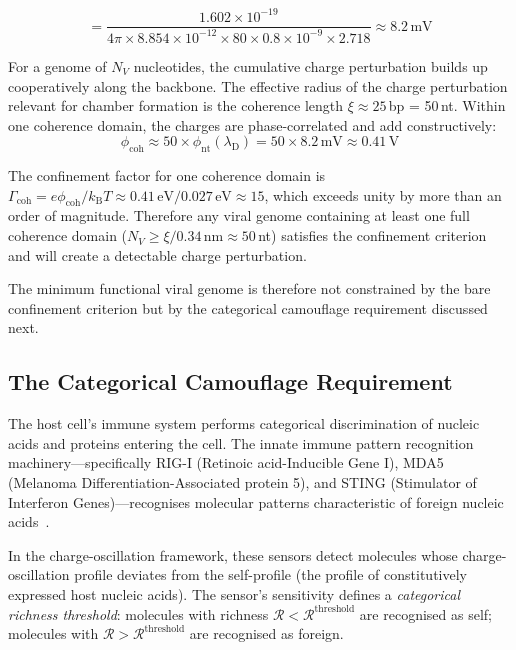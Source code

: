 \documentclass[12pt,a4paper]{article}
\theoremstyle{definition}
\theoremstyle{remark}
\newcommand{\kB}{k_{\mathrm{B}}}
\newcommand{\lD}{\lambda_{\mathrm{D}}}
\newcommand{\Rcat}{\mathcal{R}}
\begin{document}
\begin{equation}
  = \frac{1.602 \times 10^{-19}}{4\pi \times 8.854 \times 10^{-12} \times 80 \times 0.8 \times 10^{-9} \times 2.718} \approx 8.2\,\mathrm{mV}
\end{equation}

For a genome of $N_V$ nucleotides, the cumulative charge perturbation builds up cooperatively along the backbone. The effective radius of the charge perturbation relevant for chamber formation is the coherence length $\xi \approx 25$\,bp = 50\,nt. Within one coherence domain, the charges are phase-correlated and add constructively:
\begin{equation}
  \phi_{\mathrm{coh}} \approx 50 \times \phi_{\mathrm{nt}}(\lD) = 50 \times 8.2\,\mathrm{mV} \approx 0.41\,\mathrm{V}
\end{equation}

The confinement factor for one coherence domain is $\Gamma_{\mathrm{coh}} = e\phi_{\mathrm{coh}} / \kB T \approx 0.41\,\mathrm{eV} / 0.027\,\mathrm{eV} \approx 15$, which exceeds unity by more than an order of magnitude. Therefore any viral genome containing at least one full coherence domain ($N_V \geq \xi / 0.34\,\mathrm{nm} \approx 50$\,nt) satisfies the confinement criterion and will create a detectable charge perturbation.

The minimum functional viral genome is therefore not constrained by the bare confinement criterion but by the categorical camouflage requirement discussed next.

\subsection{The Categorical Camouflage Requirement}

The host cell's immune system performs categorical discrimination of nucleic acids and proteins entering the cell. The innate immune pattern recognition machinery---specifically RIG-I (Retinoic acid-Inducible Gene I), MDA5 (Melanoma Differentiation-Associated protein 5), and STING (Stimulator of Interferon Genes)---recognises molecular patterns characteristic of foreign nucleic acids~\cite{Yoneyama2004,Hornung2006,Ishikawa2008}.

In the charge-oscillation framework, these sensors detect molecules whose charge-oscillation profile deviates from the self-profile (the profile of constitutively expressed host nucleic acids). The sensor's sensitivity defines a \emph{categorical richness threshold}: molecules with richness $\Rcat < \Rcat^{\mathrm{threshold}}$ are recognised as self; molecules with $\Rcat > \Rcat^{\mathrm{threshold}}$ are recognised as foreign.
\end{document}
